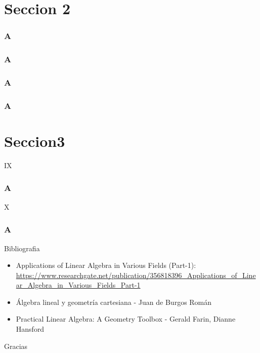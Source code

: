 \documentclass[xcolor={dvipsnames},aspectratio=169,10pt]{beamer}
\begin{document}
\section{Seccion 2}

\begin{frame}[fragile]{2.1}
    \frametitle{A}
    \lipsum[1-1]
\end{frame}

\begin{frame}[fragile]{2.2}
    \frametitle{A}
    \lipsum[1-1]
\end{frame}


\begin{frame}[fragile]{2.3}
    \frametitle{A}
    \lipsum[1-1]
\end{frame}

\begin{frame}[fragile]{2.4}
    \frametitle{A}
    \lipsum[1-1]
\end{frame}

\section{Seccion3}

\begin{frame}[fragile]{IX}
    \frametitle{A}
    \lipsum[1-1]
\end{frame}

\begin{frame}[fragile]{X}
    \frametitle{A}
    \lipsum[1-1]
\end{frame}

\begin{frame}{Bibliografia}
  \begin{itemize}
    \item Applications of Linear Algebra in Various Fields (Part-1): \url{https://www.researchgate.net/publication/356818396_Applications_of_Linear_Algebra_in_Various_Fields_Part-1}
    \item Álgebra lineal y geometría cartesiana - Juan de Burgos Román
    \item Practical Linear Algebra: A Geometry Toolbox - Gerald Farin, Dianne Hansford
  \end{itemize}
\end{frame}

\begin{frame}[standout]
  Gracias \\
\end{frame}
\end{document}
